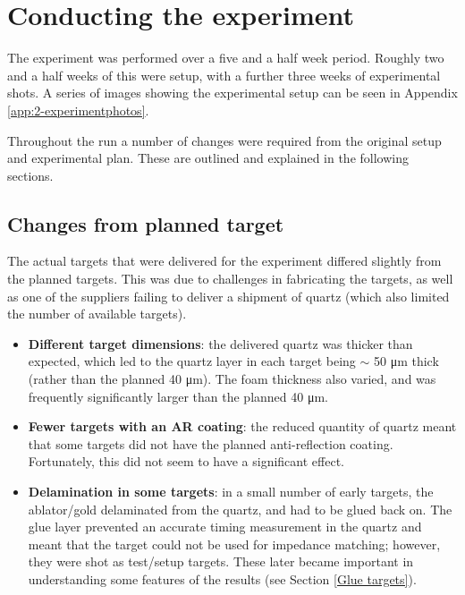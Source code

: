 
\section{Conducting the experiment}

The experiment was performed over a five and a half week period. Roughly two and a half weeks of this were setup, with a further three weeks of experimental shots. A series of images showing the experimental setup can be seen in Appendix \ref{app:2-experimentphotos}.

Throughout the run a number of changes were required from the original setup and experimental plan. These are outlined and explained in the following sections.

\subsection{Changes from planned target} \label{Target issues}
The actual targets that were delivered for the experiment differed slightly from the planned targets. This was due to challenges in fabricating the targets, as well as one of the suppliers failing to deliver a shipment of quartz (which also limited the number of available targets).
\begin{itemize}
    \item \textbf{Different target dimensions}: the delivered quartz was thicker than expected, which led to the quartz layer in each target being $\sim$ 50 \unit{\micro\meter} thick (rather than the planned 40 \unit{\micro\meter}). The foam thickness also varied, and was frequently significantly larger than the planned 40 \unit{\micro\meter}.
    \item \textbf{Fewer targets with an AR coating}: the reduced quantity of quartz meant that some targets did not have the planned anti-reflection coating. Fortunately, this did not seem to have a significant effect.
    \item \textbf{Delamination in some targets}: in a small number of early targets, the ablator/gold delaminated from the quartz, and had to be glued back on. The glue layer prevented an accurate timing measurement in the quartz and meant that the target could not be used for impedance matching; however, they were shot as test/setup targets. These later became important in understanding some features of the results (see Section \ref{Glue targets}).
\end{itemize}

